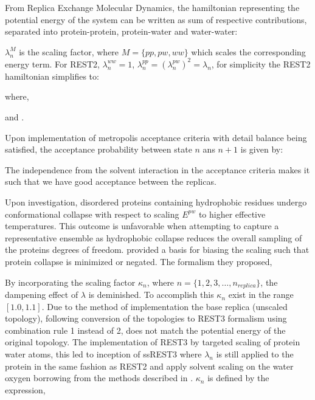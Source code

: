 From Replica Exchange Molecular Dynamics\cite{Sugita1999}, the hamiltonian representing the potential energy of the system can be written as sum of respective contributions, separated into protein-protein, protein-water and water-water:


$\lambda_{n}^M$ is the scaling factor, where $M=\{ pp, pw, ww\}
$ which scales the corresponding energy term. For REST2\cite{Wang2011}, $\lambda_n^{ww}=1$, $\lambda_n^{pp}=(\lambda_n^{pw})^2=\lambda_n$, for simplicity the REST2 hamiltonian simplifies to:

where,

and . 

Upon implementation of metropolis acceptance criteria with detail balance being satisfied, the acceptance probability between state $n$ ans $n+1$ is given by:


The independence from the solvent interaction in the acceptance criteria makes it such that we have good acceptance between the replicas.  

Upon investigation, disordered proteins containing hydrophobic residues undergo conformational collapse with respect to scaling  $E^{pw}$ to higher effective temperatures. 
This outcome is unfavorable when attempting to capture a representative ensemble as hydrophobic collapse reduces the overall sampling of the proteins degrees of freedom. %
\citeauthor{Zhang2023} \citeyear{Zhang2023} provided a basis for biasing the scaling such that protein collapse is minimized or negated. The formalism they proposed,


By incorporating the scaling factor $\kappa_n$, where $n=\{1,2,3,\ldots,n_{replica}\}$, the dampening effect of $\lambda$ is deminished. To accomplish this $\kappa_n$ exist in the range $[1.0,1.1]$. 
Due to the method of implementation the base replica (unscaled topology), following conversion of the topologies to REST3 \cite{Zhang2023} formalism using combination rule 1 instead of 2, does not match the potential energy of the original topology. 
The implementation of REST3 by \citeauthor{Zhang2023} targeted scaling of protein water atoms, this led to inception of ssREST3 where $\lambda_n$ is still applied to the protein in the same fashion as REST2 \cite{Wang2011} and apply solvent scaling on the water oxygen borrowing from the methods described in \citeauthor{Best2010} \citeyear{Best2010}. $\kappa_n$ is defined by the expression, 


